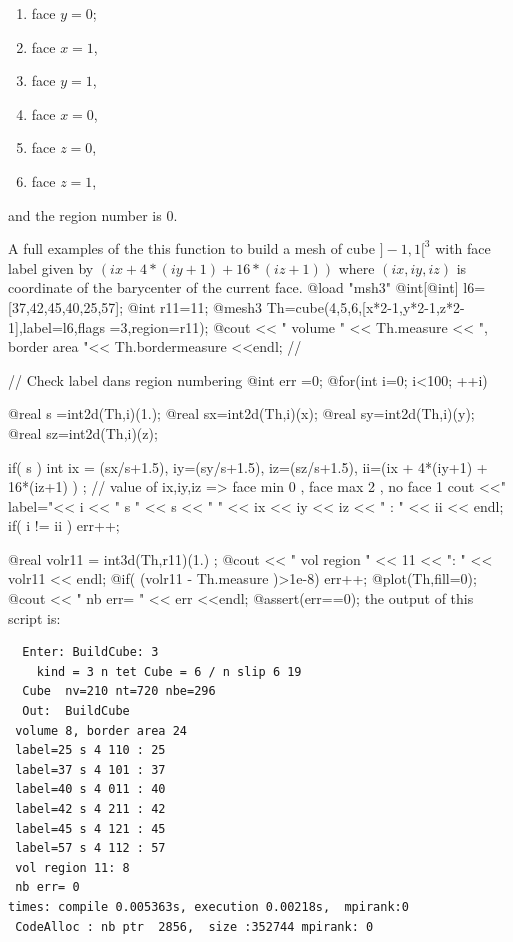 \documentclass[a4paper,twoside,12pt]{book}
\begin{document}
\begin{enumerate}[topsep=0pt,itemsep=-1ex,partopsep=1ex,parsep=1ex]
 \item face $y=0$; \item  face $x=1$, \item  face $y=1$, \item  face $x=0$, \item   face $z=0$, \item  face $z=1$,
\end{enumerate}
and the region number is $0$. 

A full examples of the this function to build a mesh of cube $]-1,1[^3$ with face label
given by $(ix + 4*(iy+1) + 16*(iz+1) ) $ where $(ix,iy,iz)$ is coordinate of the barycenter of the current face. 
\bFF
@load "msh3"
@int[@int] l6=[37,42,45,40,25,57];
@int r11=11;
@mesh3 Th=cube(4,5,6,[x*2-1,y*2-1,z*2-1],label=l6,flags =3,region=r11); 
@cout << " volume " << Th.measure << ", border area "<< Th.bordermeasure <<endl; //  

// Check label dans  region numbering 
@int err =0; 
@for(int i=0; i<100; ++i)
{
    @real s =int2d(Th,i)(1.);
    @real sx=int2d(Th,i)(x);
    @real sy=int2d(Th,i)(y);
    @real sz=int2d(Th,i)(z);
    
    if( s )
    {
     int ix = (sx/s+1.5), iy=(sy/s+1.5), iz=(sz/s+1.5), 
              ii=(ix + 4*(iy+1) + 16*(iz+1) ) ;    
      //  value of ix,iy,iz =>  face min 0 ,  face max 2  , no face 1
      cout <<" label="<< i << " s " << s << " " << ix << iy << iz 
           << " : " << ii << endl; 
      if( i != ii ) err++;
    }
}   
@real volr11 = int3d(Th,r11)(1.) ;
@cout << " vol region " << 11 << ": " << volr11 << endl; 
@if( (volr11 - Th.measure )>1e-8) err++;
@plot(Th,fill=0); 
@cout << " nb err= " << err <<endl;
@assert(err==0); 
\eFF
{}
the output of this script is:
\begin{verbatim}
  Enter: BuildCube: 3
    kind = 3 n tet Cube = 6 / n slip 6 19
  Cube  nv=210 nt=720 nbe=296
  Out:  BuildCube
 volume 8, border area 24
 label=25 s 4 110 : 25
 label=37 s 4 101 : 37
 label=40 s 4 011 : 40
 label=42 s 4 211 : 42
 label=45 s 4 121 : 45
 label=57 s 4 112 : 57
 vol region 11: 8
 nb err= 0
times: compile 0.005363s, execution 0.00218s,  mpirank:0
 CodeAlloc : nb ptr  2856,  size :352744 mpirank: 0
\end{verbatim}
\end{document}
